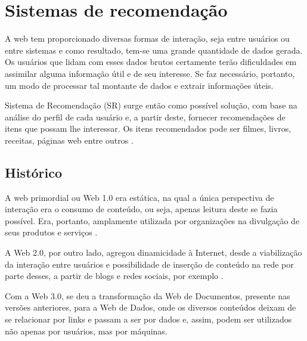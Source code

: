 \chapter{Sistemas de recomendação}
\label{cap:sistemas_de_recomendacao}



A web tem proporcionado diversas formas de interação, seja entre usuários ou entre sistemas e como resultado, tem-se uma grande quantidade de dados gerada. Os usuários que lidam com esses dados brutos certamente terão dificuldades em assimilar alguma informação útil e de seu interesse. Se faz necessário, portanto, um modo de processar tal montante de dados e extrair informações úteis. 


Sistema de Recomendação (SR) surge então como possível solução, com base na análise do perfil de cada usuário e, a partir deste, fornecer recomendações de itens que possam lhe interessar. Os itens recomendados pode ser filmes, livros, receitas, páginas web entre outros \cite{Bobadilla_2013}.

\section{Histórico}

A web primordial ou Web 1.0 era estática, na qual a única perspectiva de interação era o consumo de conteúdo, ou seja, apenas leitura deste se fazia possível. Era, portanto, amplamente utilizada por organizações na divulgação de seus produtos e serviços \cite{Aghaei2012}. 

A Web 2.0, por outro lado, agregou dinamicidade à Internet, desde a viabilização da interação entre usuários e possibilidade de inserção de conteúdo na rede por parte desses, a partir de blogs e redes sociais, por exemplo \cite{Nath2014}.

Com a Web 3.0, se deu a transformação da Web de Documentos, presente nas versões anteriores, para a Web de Dados, onde os diversos conteúdos deixam de se relacionar por links e passam a ser por dados e, assim, podem ser utilizados não apenas por usuários, mas por máquinas.
 
